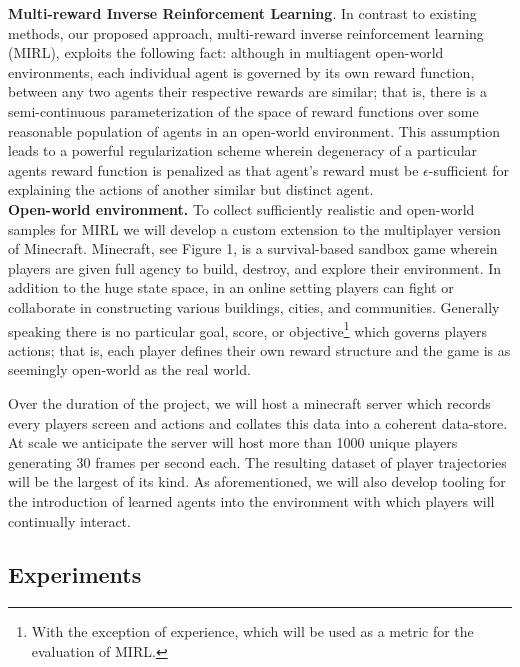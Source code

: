 \documentclass[11pt]{article}
\begin{document}
\noindent\textbf{Multi-reward Inverse Reinforcement Learning}. In contrast to existing methods, our proposed approach, multi-reward inverse reinforcement learning (MIRL), exploits the following fact: although in multiagent open-world environments, each individual agent is governed by its own reward function, between any two agents their respective rewards are similar; that is, there is a semi-continuous parameterization of the space of reward functions over some reasonable population of agents in an open-world environment. This assumption leads to a powerful regularization scheme wherein degeneracy of a particular agents reward function is penalized as that agent's reward must be $\epsilon$-sufficient for explaining the actions of another similar but distinct agent. \\

\noindent \textbf{Open-world environment.} To collect sufficiently realistic and open-world samples for MIRL we will develop a custom extension to the multiplayer version of Minecraft. Minecraft, see Figure 1, is a survival-based sandbox game wherein players are given full agency to build, destroy, and explore their environment. In addition to the huge state space, in an online setting players can fight or collaborate in constructing various buildings, cities, and communities. Generally speaking there is no particular goal, score, or objective\footnote{With the exception of experience, which will be used as a metric for  the evaluation of MIRL.} which governs players actions; that is, each player defines their own reward structure and the game is as seemingly open-world as the real world.

Over the duration of the project, we will host a minecraft server which records every players screen and actions and collates this data into a coherent data-store. At scale we anticipate the server will host more than 1000 unique players generating 30 frames per second each. The resulting dataset of player trajectories will be the largest of its kind. As aforementioned, we will also develop tooling for the introduction of learned agents into the environment with which players will continually interact.





\subsection{Experiments}
\end{document}
